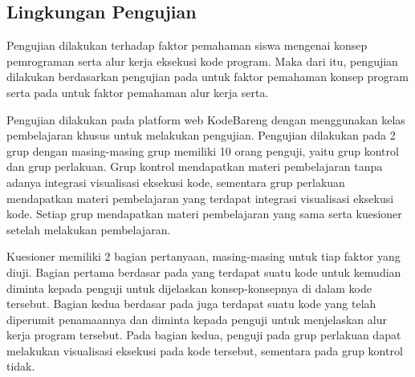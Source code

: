 \subsection{Lingkungan Pengujian}
Pengujian  dilakukan terhadap faktor pemahaman siswa mengenai konsep pemrograman serta alur kerja eksekusi kode program. Maka dari itu, pengujian dilakukan berdasarkan pengujian pada \textcite{mayer1981psychology} untuk faktor pemahaman konsep program serta pada \textcite{moons2013pilot} untuk faktor pemahaman alur kerja serta.

Pengujian dilakukan pada platform web KodeBareng dengan menggunakan kelas pembelajaran khusus untuk melakukan pengujian. Pengujian dilakukan pada 2 grup dengan masing-masing grup memiliki 10 orang penguji, yaitu grup kontrol dan grup perlakuan. Grup kontrol mendapatkan materi pembelajaran tanpa adanya integrasi visualisasi eksekusi kode, sementara grup perlakuan mendapatkan materi pembelajaran yang terdapat integrasi visualisasi eksekusi kode. Setiap grup mendapatkan materi pembelajaran yang sama serta kuesioner setelah melakukan pembelajaran.

Kuesioner memiliki 2 bagian pertanyaan, masing-masing untuk tiap faktor yang diuji. Bagian pertama berdasar pada \textcite{mayer1981psychology} yang terdapat suatu kode untuk kemudian diminta kepada penguji untuk dijelaskan konsep-konsepnya di dalam kode tersebut. Bagian kedua berdasar pada \textcite{moons2013pilot} juga terdapat suatu kode yang telah diperumit penamaannya dan diminta kepada penguji untuk menjelaskan alur kerja program tersebut. Pada bagian kedua, penguji pada grup perlakuan dapat melakukan visualisasi eksekusi pada kode tersebut, sementara pada grup kontrol tidak.



